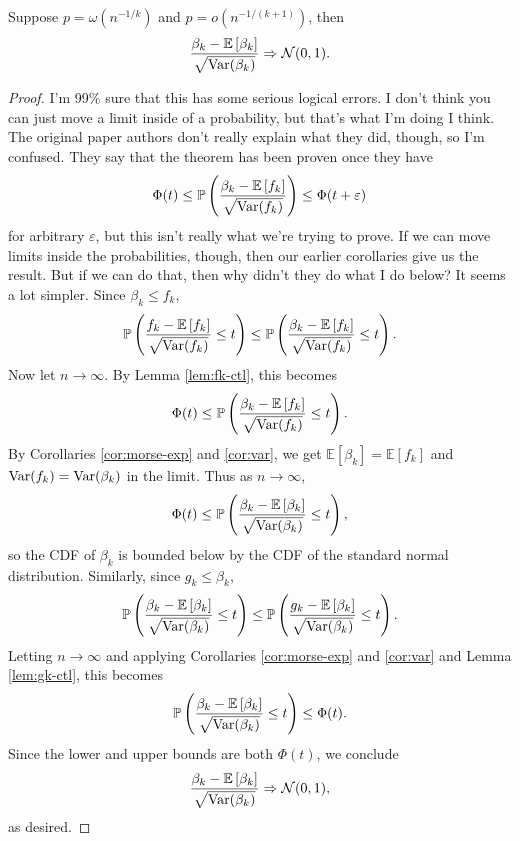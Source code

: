 \documentclass[twoside,10pt]{report}
\begin{document}
\begin{thrm}[]
	Suppose $p=\omega(n^{-1/k})$ and $p=o(n^{-1/(k+1)})$, then
\[
	\frac{\beta_{k}- \mathbb{E}\left[ \beta_{k} \right]}{\sqrt{\operatorname{Var}(\beta_{k})} } \Rightarrow \mathcal{N}(0,1).
\] 
\end{thrm}
\begin{proof}
	{\color{red}I'm 99\% sure that this has some serious logical errors. I don't think you can just move a limit inside of a probability, but that's what I'm doing I think. The original paper authors don't really explain what they did, though, so I'm confused. They say that the theorem has been proven once they have
	\[
		\Phi(t) \leq \mathbb{P}\left( \frac{\beta_{k}-\mathbb{E}\left[ f_{k} \right]}{\sqrt{\operatorname{Var}(f_{k})} }  \right) \leq \Phi(t + \varepsilon)
	\] for arbitrary $\varepsilon$, but this isn't really what we're trying to prove. If we can move limits inside the probabilities, though, then our earlier corollaries give us the result. But if we can do that, then why didn't they do what I do below? It seems a lot simpler.}
	Since $\beta_{k} \leq f_{k}$,
	\[
		\mathbb{P}\left( \frac{f_{k}-\mathbb{E}\left[ f_{k} \right]}{\sqrt{\operatorname{Var}(f_{k})} } \leq t \right)  \leq \mathbb{P}\left( \frac{\beta_{k}-\mathbb{E}\left[ f_{k} \right]}{\sqrt{\operatorname{Var}(f_{k})} } \leq t \right).
	\] 
	Now let $n\to \infty$. By Lemma \ref{lem:fk-ctl}, this becomes
	\[
		\Phi(t) \leq \mathbb{P}\left( \frac{\beta_{k}-\mathbb{E}\left[ f_{k} \right]}{\sqrt{\operatorname{Var}(f_{k})} } \leq t \right).
	\] By Corollaries \ref{cor:morse-exp} and \ref{cor:var}, we get $\mathbb{E}\left[ \beta_{k} \right]=\mathbb{E}\left[ f_{k} \right]$ and $\operatorname{Var}(f_{k}) = \operatorname{Var}(\beta_{k})$ in the limit. Thus as $n\to \infty$,
	\[
		\Phi(t) \leq \mathbb{P}\left( \frac{\beta_{k}-\mathbb{E}\left[ \beta_{k} \right]}{\sqrt{\operatorname{Var}(\beta_{k})} } \leq t \right),
	\] 
	so the CDF of $\beta_{k}$ is bounded below by the CDF of the standard normal distribution. Similarly, since $g_{k} \leq \beta_{k}$,
	\[
		\mathbb{P}\left( \frac{\beta_{k}-\mathbb{E}\left[ \beta_{k} \right]}{\sqrt{\operatorname{Var}(\beta_{k})} } \leq t \right) \leq \mathbb{P}\left( \frac{g_{k}-\mathbb{E}\left[ \beta_{k} \right]}{\sqrt{\operatorname{Var}(\beta_{k})} } \leq t \right).
	\] Letting $n\to \infty$ and applying Corollaries \ref{cor:morse-exp} and \ref{cor:var} and Lemma \ref{lem:gk-ctl}, this becomes
	\[
		\mathbb{P}\left( \frac{\beta_{k}-\mathbb{E}\left[ \beta_{k} \right]}{\sqrt{\operatorname{Var}(\beta_{k})} } \leq t \right) \leq \Phi(t).
	\] Since the lower and upper bounds are both $\Phi(t)$, we conclude
	\[
		\frac{\beta_{k}-\mathbb{E}\left[ \beta_{k} \right]}{\sqrt{\operatorname{Var}(\beta_{k})} } \Rightarrow \mathcal{N}(0,1),
	\] as desired.
\end{proof}
\end{document}
